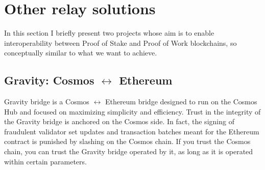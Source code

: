 \section{Other relay solutions}
In this section I briefly present two projects whose aim is to enable interoperability between Proof of Stake and Proof of Work blockchains, so conceptually similar to what we want to achieve. 

\subsection{Gravity: Cosmos $\leftrightarrow$ Ethereum}
Gravity bridge is a Cosmos $\leftrightarrow$ Ethereum bridge designed to run on the Cosmos Hub and focused on maximizing simplicity and efficiency. Trust in the integrity of the Gravity bridge is anchored on the Cosmos side. In fact, the signing of fraudulent validator set updates and transaction batches meant for the Ethereum contract is punished by slashing on the Cosmos chain. If you trust the Cosmos chain, you can trust the Gravity bridge operated by it, as long as it is operated within certain parameters. 

